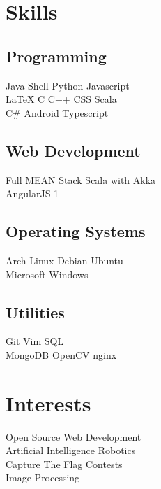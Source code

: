 \documentclass[]{deedy-resume-openfont}
\begin{document}
\begin{minipage}[t]{0.33\textwidth}

\section{Skills}
\subsection{Programming}
Java \textbullet{}   Shell \textbullet{} Python \textbullet{} Javascript \\
\LaTeX{} \textbullet{} C \textbullet{} C++ \textbullet{} CSS \textbullet{} Scala \\
C\# \textbullet{} Android \textbullet{} Typescript
\subsection{Web Development}
Full MEAN Stack \textbullet{} Scala with Akka \\
AngularJS 1
\subsection{Operating Systems}
Arch Linux \textbullet{} Debian \textbullet{} Ubuntu \\
Microsoft Windows
\subsection{Utilities}
Git \textbullet{} Vim \textbullet{} SQL \\
MongoDB \textbullet{} OpenCV \textbullet{} nginx \\


\section{Interests}
Open Source \textbullet{} Web Development \textbullet{} \\
Artificial Intelligence \textbullet{} Robotics \\
Capture The Flag Contests \\
Image Processing
%
%

\end{minipage} 
\hfill
\end{document}
